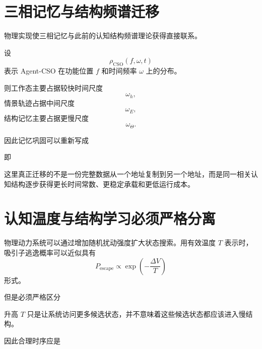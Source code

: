 \section{三相记忆与结构频谱迁移}

物理实现使三相记忆与此前的认知结构频谱理论获得直接联系。

设
\[
\rho_{\mathrm{CSO}}(f,\omega,t)
\]
表示 Agent-CSO 在功能位置 $f$ 和时间频率 $\omega$ 上的分布。

则工作态主要占据较快时间尺度
\[
\omega_h,
\]
情景轨迹占据中间尺度
\[
\omega_E,
\]
结构记忆主要占据更慢尺度
\[
\omega_\Theta.
\]

因此记忆巩固可以重新写成
\begin{statementbox}
\centering
{}
\end{statementbox}

即
\begin{statementbox}
\centering
{}
\end{statementbox}

这里真正迁移的不是一份完整数据从一个地址复制到另一个地址，而是同一相关认知结构逐步获得更长时间常数、更稳定承载和更低运行成本。

\section{认知温度与结构学习必须严格分离}

物理动力系统可以通过增加随机扰动强度扩大状态搜索。用有效温度 $T$ 表示时，吸引子逃逸概率可以近似具有
\[
P_{\mathrm{escape}}
\propto
\exp\left(
-\frac{\Delta V}{T}
\right)
\]
形式。

但是必须严格区分
\begin{statementbox}
\centering
{}
\end{statementbox}

升高 $T$ 只是让系统访问更多候选状态，并不意味着这些候选状态都应该进入慢结构。

因此合理时序应是
\begin{statementbox}
\centering
{}
\end{statementbox}

